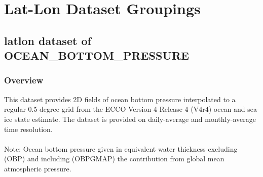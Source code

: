 \section{Lat-Lon Dataset Groupings}
\subsection{latlon dataset of OCEAN\_BOTTOM\_PRESSURE}
\newp
\subsubsection{Overview}
This dataset provides 2D fields of ocean bottom pressure interpolated to a regular 0.5-degree grid from the ECCO Version 4 Release 4 (V4r4) ocean and sea-ice state estimate. The dataset is provided on daily-average and monthly-average time resolution.
\\\\
Note: Ocean bottom pressure given in equivalent water thickness excluding (OBP) and including (OBPGMAP) the contribution from global mean atmospheric pressure.
\\

